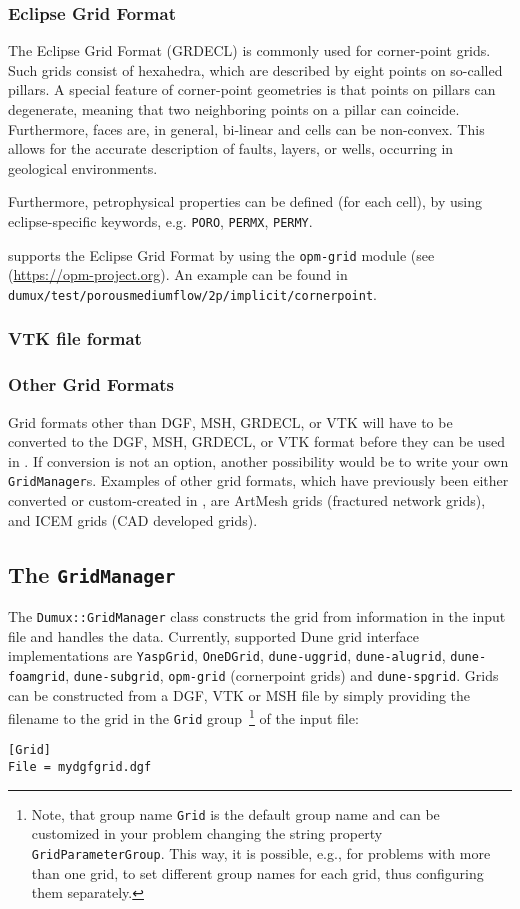 \subsubsection{Eclipse Grid Format}
The Eclipse Grid Format (GRDECL) is commonly used for corner-point grids.
Such grids consist of hexahedra, which are described by eight points on so-called pillars. A special feature of corner-point geometries is that points on pillars can degenerate, meaning that two neighboring points on a pillar can coincide. Furthermore, faces are, in general, bi-linear and cells can be non-convex. This allows for the accurate description of faults, layers, or wells, occurring in geological environments.

Furthermore, petrophysical properties can be defined (for each cell), by using eclipse-specific keywords, e.g. \texttt{PORO}, \texttt{PERMX}, \texttt{PERMY}.

\Dumux supports the Eclipse Grid Format by using the \texttt{opm-grid} module (see (\url{https://opm-project.org}).
An example can be found in \texttt{dumux/test\allowbreak/porousmediumflow/2p/implicit/cornerpoint}.

\subsubsection{VTK file format}


\subsubsection{Other Grid Formats}
Grid formats other than DGF, MSH, GRDECL, or VTK will have to be converted to the DGF, MSH, GRDECL, or VTK format before they can be used in \Dumux.
If conversion is not an option, another possibility would be to write your own \texttt{GridManager}s. Examples of other grid formats,
which have previously been either converted or custom-created in \Dumux, are ArtMesh grids (fractured network grids), and ICEM grids (CAD developed grids).

\subsection{The \Dumux \texttt{GridManager}}
The \texttt{Dumux::GridManager} class constructs the grid from information in the input file and handles the data.
Currently, supported Dune grid interface implementations  are \texttt{YaspGrid}, \texttt{OneDGrid}, \texttt{dune-uggrid}, \texttt{dune-alugrid}, \texttt{dune-foamgrid}, \texttt{dune-subgrid}, \texttt{opm-grid} (cornerpoint grids) and \texttt{dune-spgrid}.
Grids can be constructed from a DGF, VTK or MSH file by simply providing the filename to the grid in the \texttt{Grid} group~\footnote{Note,
that group name \texttt{Grid} is the default group name and can be customized in your problem changing the string property \texttt{GridParameterGroup}.
This way, it is possible, e.g., for problems with more than one grid, to set different group names for each grid, thus configuring them separately.}
of the input file:
\begin{lstlisting}[style=DumuxParameterFile]
[Grid]
File = mydgfgrid.dgf
\end{lstlisting}

